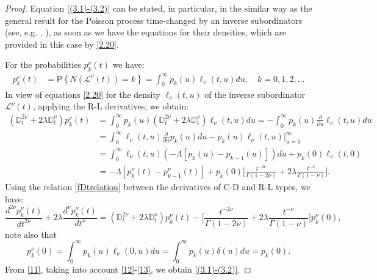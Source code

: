 \documentclass[12pt]{article}
\theoremstyle{definition}
\theoremstyle{plain}
\newcommand{\Prob}{\mathsf{P}}
\begin{document}
\begin{proof}
	Equation \eqref{(3.1)-(3.2)} can be stated, in particular, in the similar way as the general result for the Poisson process time-changed by an inverse subordinators (see, e.g. \cite{BS2019}, \cite{BS2024}), as soon as we have the equations for their densities, which are provided in this case by \eqref{2.20}.
	
	For the probabilities $p_k^\nu(t)$ we have:
	\begin{align}
	p_k^\nu(t)&=\Prob\left\{N\left(\mathcal{L}^\nu(t)\right)=k\right\}
	=\int_{0}^{\infty}p_k(u)\ell_\nu(t,u)du,\nonumber%
	\quad k=0,1,2,\dots
	\end{align}
	In view of equations \eqref{2.20} for the density $\ell_\nu(t,u)$ of the inverse subordinator $\mathcal{L}^\nu(t)$, applying the R-L derivatives, we obtain:
	\begin{align}
	\left( \mathbb{D}_t^{2\nu} + 2\lambda \mathbb{D}_t^{\nu}\right) p_k^\nu(t)
	&=\int_{0}^{\infty}p_k(u)\left( \mathbb{D}_t^{2\nu} + 2\lambda \mathbb{D}_t^{\nu}\right)\ell_\nu(t,u)du=- \int_{0}^{\infty}p_k(u)\frac{\partial}{\partial  u}\ell_\nu(t,u)du\nonumber\\
	&=\int_{0}^{\infty}\ell_\nu(t,u)\frac{\partial}{\partial  u}p_k(u)du-p_k(u)\ell_\nu(t,u)\big|_{u=0}^\infty\nonumber\\
	&=\int_{0}^{\infty}\ell_\nu(t,u)(-\Lambda[p_k(u)-p_{k-1}(u)])du+p_k(0)\ell_\nu(t,0)\nonumber\\
	&=-\Lambda\left[p^\nu_k(t)-p^\nu_{k-1}(t)\right]+p_k(0)\Big[\frac{t^{-2\nu}}{\Gamma(1-2\nu)} + 2\lambda \frac{t^{-\nu}}{\Gamma(1-\nu)}  \Big]. \label{11}
	\end{align}
	Using the relation \eqref{fDtrelation}
	    between the derivatives of C-D and R-L types, we have:
	\begin{equation}\label{12}
	\frac{d^{2\nu} p_k^\nu(t)}{dt^{2\nu}} + 2\lambda \frac{d^\nu p_k^\nu(t)}{dt^\nu} = \left( \mathbb{D}_t^{2\nu} + 2\lambda \mathbb{D}_t^{\nu}\right) p_k^\nu(t)-\Big[\frac{t^{-2\nu}}{\Gamma(1-2\nu)} + 2\lambda \frac{t^{-\nu}}{\Gamma(1-\nu)}  \Big]p_k^\nu(0),
	\end{equation}
	 note also that
	\begin{equation}\label{13}
	p_k^\nu(0)=\int_{0}^{\infty}p_k(u)\ell_\nu(0,u)du=\int_{0}^{\infty}p_k(u)\delta(u)du=p_k(0).
	\end{equation}
	From \eqref{11}, taking into account \eqref{12}-\eqref{13}, we  obtain \eqref{(3.1)-(3.2)}.
\end{proof}
\end{document}
